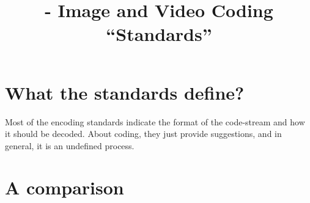 
\title{\SM{} - Image and Video Coding ``Standards''}

\maketitle

\tableofcontents

\section{What the standards define?}
Most of the encoding standards indicate the format of the code-stream
and how it should be decoded. About coding, they just provide
suggestions, and in general, it is an undefined process.


\section{A comparison}

